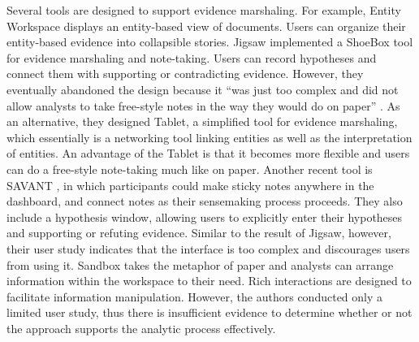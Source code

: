 Several tools are designed to support evidence marshaling. For example, Entity Workspace \citep{Bier2010} displays an entity-based view of documents. Users can organize their entity-based evidence into collapsible stories. Jigsaw \citep{Gorg2014} implemented a ShoeBox tool for evidence marshaling and note-taking. Users can record hypotheses and connect them with supporting or contradicting evidence. However, they eventually abandoned the design because it ``was just too complex and did not allow analysts to take free-style notes in the way they would do on paper'' \citep[p. 342]{Gorg2014}. As an alternative, they designed Tablet, a simplified tool for evidence marshaling, which essentially is a networking tool linking entities as well as the interpretation of entities. An advantage of the Tablet is that it becomes more flexible and users can do a free-style note-taking much like on paper. Another recent tool is SAVANT \citep{Goyal2016}, in which participants could make sticky notes anywhere in the dashboard, and connect notes as their sensemaking process proceeds. They also include a hypothesis window, allowing users to explicitly enter their hypotheses and supporting or refuting evidence. Similar to the result of Jigsaw, however, their user study indicates that the interface is too complex and discourages users from using it. Sandbox \citep{Wright2006} takes the metaphor of paper and analysts can arrange information within the workspace to their need. Rich interactions are designed to facilitate information manipulation. However, the authors conducted only a limited user study, thus there is insufficient evidence to determine whether or not the approach supports the analytic process effectively. 

